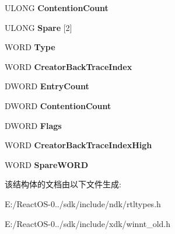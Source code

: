 \begin{DoxyCompactItemize}
\item 
\mbox{\label{struct___r_t_l___c_r_i_t_i_c_a_l___s_e_c_t_i_o_n___d_e_b_u_g_ad56751ea482324516f763cc25df2d86a}} 
U\+L\+O\+NG {\bfseries Contention\+Count}
\item 
\mbox{\label{struct___r_t_l___c_r_i_t_i_c_a_l___s_e_c_t_i_o_n___d_e_b_u_g_a679138334f430e32465031b1ab019d35}} 
U\+L\+O\+NG {\bfseries Spare} \mbox{[}2\mbox{]}
\item 
\mbox{\label{struct___r_t_l___c_r_i_t_i_c_a_l___s_e_c_t_i_o_n___d_e_b_u_g_aeb8997979a2af7379fcb5011c9f24d8b}} 
W\+O\+RD {\bfseries Type}
\item 
\mbox{\label{struct___r_t_l___c_r_i_t_i_c_a_l___s_e_c_t_i_o_n___d_e_b_u_g_ad835ed6db98f5bcb47693b2856b931f9}} 
W\+O\+RD {\bfseries Creator\+Back\+Trace\+Index}
\item 
\mbox{\label{struct___r_t_l___c_r_i_t_i_c_a_l___s_e_c_t_i_o_n___d_e_b_u_g_a3e29b89ff51304118711f6e1be45245d}} 
D\+W\+O\+RD {\bfseries Entry\+Count}
\item 
\mbox{\label{struct___r_t_l___c_r_i_t_i_c_a_l___s_e_c_t_i_o_n___d_e_b_u_g_ac24033fcce908566db922c88e9a225a3}} 
D\+W\+O\+RD {\bfseries Contention\+Count}
\item 
\mbox{\label{struct___r_t_l___c_r_i_t_i_c_a_l___s_e_c_t_i_o_n___d_e_b_u_g_ad1e1c8cfef093f6d92628b85156af8e0}} 
D\+W\+O\+RD {\bfseries Flags}
\item 
\mbox{\label{struct___r_t_l___c_r_i_t_i_c_a_l___s_e_c_t_i_o_n___d_e_b_u_g_aa63e72175c6493c8e4db1a837e9d76f6}} 
W\+O\+RD {\bfseries Creator\+Back\+Trace\+Index\+High}
\item 
\mbox{\label{struct___r_t_l___c_r_i_t_i_c_a_l___s_e_c_t_i_o_n___d_e_b_u_g_a1000992c0c6ff54e82b46bb5a5f78315}} 
W\+O\+RD {\bfseries Spare\+W\+O\+RD}
\end{DoxyCompactItemize}


该结构体的文档由以下文件生成\+:\begin{DoxyCompactItemize}
\item 
E\+:/\+React\+O\+S-\/0../sdk/include/ndk/rtltypes.\+h\item 
E\+:/\+React\+O\+S-\/0../sdk/include/xdk/winnt\+\_\+old.\+h\end{DoxyCompactItemize}
